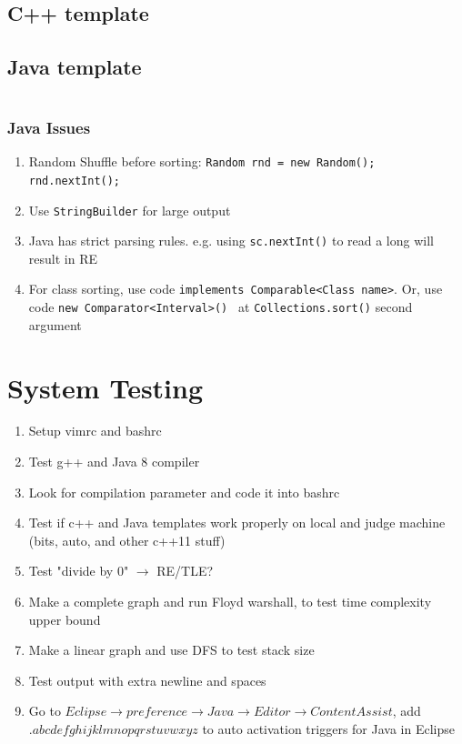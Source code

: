 \documentclass[10pt,oneside]{article}
\begin{document}
\begin{landscape}
\begin{multicols}{2}
\subsection{C++ template}

\subsection{Java template}
%
\inputminted{java}{contest_setup/Main.java}

\subsubsection{Java Issues}
\begin{enumerate}
	\item Random Shuffle before sorting: \texttt{Random rnd = new Random(); rnd.nextInt();}
	\item Use \texttt{StringBuilder} for large output
	\item Java has strict parsing rules. e.g. using \texttt{sc.nextInt()} to read a long will result in RE
	\item For class sorting, use code \texttt{implements Comparable<Class name>}. Or, use code \texttt{new Comparator<Interval>() {}} at \texttt{Collections.sort()} second argument
\end{enumerate}

\section{System Testing}

\begin{enumerate}
	\item Setup vimrc and bashrc
	\item Test g++ and Java 8 compiler
	\item Look for compilation parameter and code it into bashrc
	\item Test if c++ and Java templates work properly on local and judge machine (bits, auto, and other c++11 stuff)
	\item Test "divide by 0" $\rightarrow$ RE/TLE?
	\item Make a complete graph and run Floyd warshall, to test time complexity upper bound
	\item Make a linear graph and use DFS to test stack size
	\item Test output with extra newline and spaces
	\item Go to $Eclipse \rightarrow preference \rightarrow Java \rightarrow Editor \rightarrow Content Assist$, add $.abcdefghijklmnopqrstuvwxyz$ to auto activation triggers for Java in Eclipse
\end{enumerate}


\end{multicols}
\end{landscape}
\end{document}
